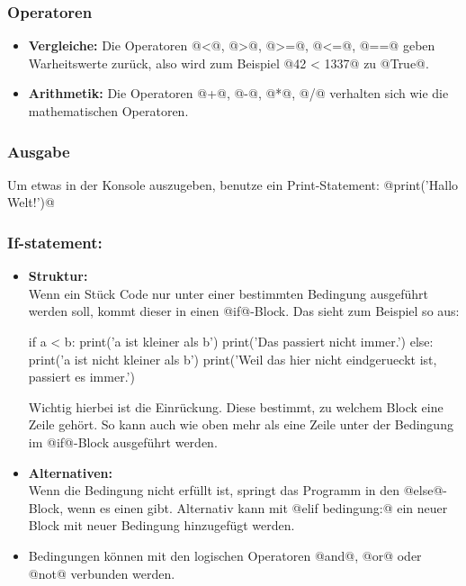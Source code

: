     
    \subsubsection*{Operatoren}
    \begin{itemize}
        \item \textbf{Vergleiche: }
        Die Operatoren @<@, @>@, @>=@, @<=@, @==@ geben Warheitswerte zurück, also wird zum Beispiel @42 < 1337@ zu @True@. 
        \item \textbf{Arithmetik: }
        Die Operatoren @+@, @-@, @*@, @/@ verhalten sich wie die mathematischen Operatoren. 
    \end{itemize}
    
    \subsubsection*{Ausgabe}
    Um etwas in der Konsole auszugeben, benutze ein Print-Statement: @print('Hallo Welt!')@
 
    \subsubsection*{If-statement:} 
    \begin{itemize}
        \item
        \textbf{Struktur:}\\
        Wenn ein Stück Code nur unter einer bestimmten Bedingung ausgeführt werden soll, kommt dieser in einen @if@-Block. 
        Das sieht zum Beispiel so aus:
        \begin{code}
if a < b:
    print('a ist kleiner als b')
    print('Das passiert nicht immer.')
else:
    print('a ist nicht kleiner als b')
print('Weil das hier nicht eindgerueckt ist, passiert es immer.')
        \end{code}
        Wichtig hierbei ist die Einrückung. Diese bestimmt, zu welchem Block eine Zeile gehört. So kann auch wie oben mehr als eine Zeile unter der Bedingung im @if@-Block ausgeführt werden.
    
        \item 
        \textbf{Alternativen:}\\
        Wenn die Bedingung nicht erfüllt ist, springt das Programm in den @else@-Block, wenn es einen gibt. Alternativ kann mit @elif bedingung:@ ein neuer Block mit neuer Bedingung hinzugefügt werden. 
    
        \item 
        Bedingungen können mit den logischen Operatoren @and@, @or@ oder @not@ verbunden werden.
    \end{itemize}  
    
